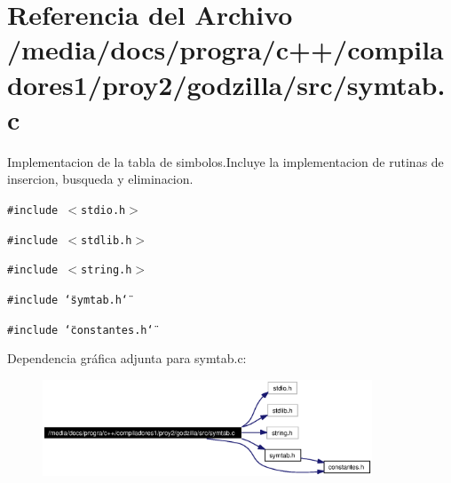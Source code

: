 \section{Referencia del Archivo /media/docs/progra/c++/compiladores1/proy2/godzilla/src/symtab.c}
\label{symtab_8c}
Implementacion de la tabla de simbolos.Incluye la implementacion de rutinas de insercion, busqueda y eliminacion. 

{\tt \#include $<$stdio.h$>$}\par
{\tt \#include $<$stdlib.h$>$}\par
{\tt \#include $<$string.h$>$}\par
{\tt \#include \char`\"{}symtab.h\char`\"{}}\par
{\tt \#include \char`\"{}constantes.h\char`\"{}}\par


Dependencia gr\'{a}fica adjunta para symtab.c:\begin{figure}[H]
\begin{center}
\leavevmode
\includegraphics[width=278pt]{symtab_8c__incl}
\end{center}
\end{figure}
